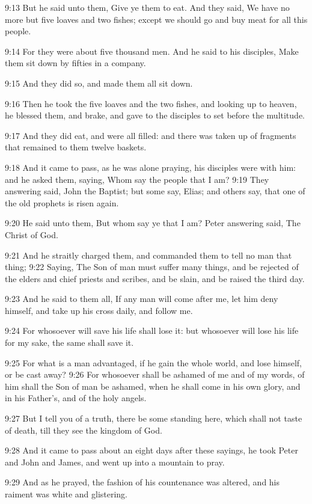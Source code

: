 9:13 But he said unto them, Give ye them to eat. And they said, We have no more but five loaves and two fishes; except we should go and buy meat for all this people.

9:14 For they were about five thousand men. And he said to his disciples, Make them sit down by fifties in a company.

9:15 And they did so, and made them all sit down.

9:16 Then he took the five loaves and the two fishes, and looking up to heaven, he blessed them, and brake, and gave to the disciples to set before the multitude.

9:17 And they did eat, and were all filled: and there was taken up of fragments that remained to them twelve baskets.

9:18 And it came to pass, as he was alone praying, his disciples were with him: and he asked them, saying, Whom say the people that I am?  9:19 They answering said, John the Baptist; but some say, Elias; and others say, that one of the old prophets is risen again.

9:20 He said unto them, But whom say ye that I am? Peter answering said, The Christ of God.

9:21 And he straitly charged them, and commanded them to tell no man that thing; 9:22 Saying, The Son of man must suffer many things, and be rejected of the elders and chief priests and scribes, and be slain, and be raised the third day.

9:23 And he said to them all, If any man will come after me, let him deny himself, and take up his cross daily, and follow me.

9:24 For whosoever will save his life shall lose it: but whosoever will lose his life for my sake, the same shall save it.

9:25 For what is a man advantaged, if he gain the whole world, and lose himself, or be cast away?  9:26 For whosoever shall be ashamed of me and of my words, of him shall the Son of man be ashamed, when he shall come in his own glory, and in his Father's, and of the holy angels.

9:27 But I tell you of a truth, there be some standing here, which shall not taste of death, till they see the kingdom of God.

9:28 And it came to pass about an eight days after these sayings, he took Peter and John and James, and went up into a mountain to pray.

9:29 And as he prayed, the fashion of his countenance was altered, and his raiment was white and glistering.

